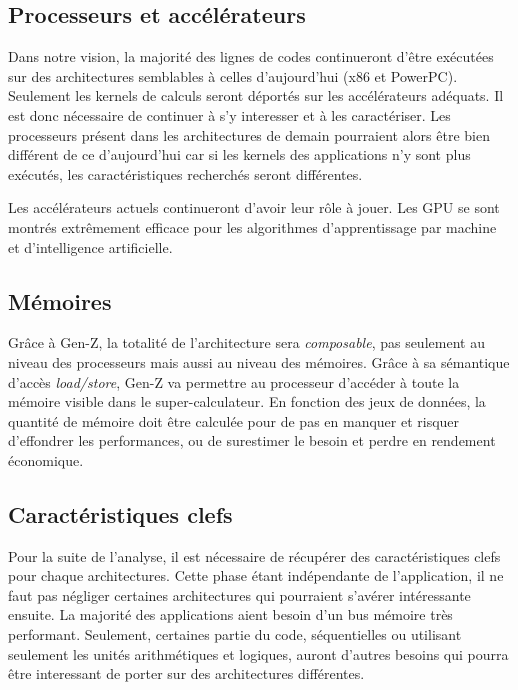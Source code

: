 \subsection{Processeurs et accélérateurs}

Dans notre vision, la majorité des lignes de codes continueront d'être exécutées sur des architectures semblables à celles d'aujourd'hui (x86 et PowerPC). Seulement les kernels de calculs seront déportés sur les accélérateurs adéquats. Il est donc nécessaire de continuer à s'y interesser et à les caractériser. Les processeurs présent dans les architectures de demain pourraient alors être bien différent de ce d'aujourd'hui car si les kernels des applications n'y sont plus exécutés, les caractéristiques recherchés seront différentes. 

Les accélérateurs actuels continueront d'avoir leur rôle à jouer. Les GPU se sont montrés extrêmement efficace pour les algorithmes d'apprentissage par machine et d'intelligence artificielle.



\subsection{Mémoires}

Grâce à Gen-Z, la totalité de l'architecture sera \textit{composable}, pas seulement au niveau des processeurs mais aussi au niveau des mémoires. Grâce à sa sémantique d'accès \textit{load/store}, Gen-Z va permettre au processeur d'accéder à toute la mémoire visible dans le super-calculateur. En fonction des jeux de données, la quantité de mémoire doit être calculée pour de pas en manquer et risquer d'effondrer les performances, ou de surestimer le besoin et perdre en rendement économique. 



\subsection{Caractéristiques clefs}

Pour la suite de l'analyse, il est nécessaire de récupérer des caractéristiques clefs pour chaque architectures. Cette phase étant indépendante de l'application, il ne faut pas négliger certaines architectures qui pourraient s'avérer intéressante ensuite. La majorité des applications aient besoin d'un bus mémoire très performant. Seulement, certaines partie du code, séquentielles ou utilisant seulement les unités arithmétiques et logiques, auront d'autres besoins qui pourra être interessant de porter sur des architectures différentes.

